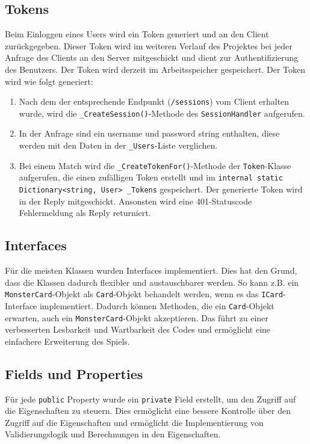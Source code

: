 \documentclass[a4paper, 12pt]{article}
\begin{document}
\subsection{Tokens}
Beim Einloggen eines Users wird ein Token generiert und an den Client zurückgegeben. Dieser Token wird im weiteren Verlauf des Projektes bei jeder Anfrage des Clients an den Server mitgeschickt und dient zur Authentifizierung des Benutzers. Der Token wird derzeit im Arbeitsspeicher gespeichert. Der Token wird wie folgt generiert:
\begin{enumerate}
    \item Nach dem der entsprechende Endpunkt (\texttt{/sessions}) vom Client erhalten wurde, wird die \texttt{\_CreateSession()}-Methode des \texttt{SessionHandler} aufgerufen.
    \item In der Anfrage sind ein username und password string enthalten, diese werden mit den Daten in der \texttt{\_Users}-Liste verglichen.
    \item Bei einem Match wird die \texttt{\_CreateTokenFor()}-Methode der \texttt{Token}-Klasse aufgerufen, die einen zufälligen Token erstellt und im \texttt{internal static Dictionary<string, User> \_Tokens} gespeichert. Der generierte Token wird in der Reply mitgeschickt. Ansonsten wird eine 401-Statuscode Fehlermeldung als Reply returniert.
\end{enumerate}

\subsection{Interfaces}
Für die meisten Klassen wurden Interfaces implementiert. Dies hat den Grund, dass die Klassen dadurch flexibler und austauschbarer werden. So kann z.B. ein \texttt{MonsterCard}-Objekt als \texttt{Card}-Objekt behandelt werden, wenn es das \texttt{ICard}-Interface implementiert. Dadurch können Methoden, die ein \texttt{Card}-Objekt erwarten, auch ein \texttt{MonsterCard}-Objekt akzeptieren.
Das führt zu einer verbesserten Lesbarkeit und Wartbarkeit des Codes und ermöglicht eine einfachere Erweiterung des Spiels.

\subsection{Fields und Properties}
Für jede \texttt{public} Property wurde ein \texttt{private} Field erstellt, um den Zugriff auf die Eigenschaften zu steuern. Dies ermöglicht eine bessere Kontrolle über den Zugriff auf die Eigenschaften und ermöglicht die Implementierung von Validierungslogik und Berechnungen in den Eigenschaften.
\end{document}
